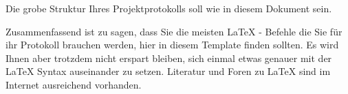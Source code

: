 \documentclass[a4paper,11pt]{scrartcl}
\begin{document}
Die grobe Struktur Ihres Projektprotokolls soll wie in diesem Dokument sein.

Zusammenfassend ist zu sagen, dass Sie die meisten \LaTeX{} - Befehle die Sie für ihr Protokoll
brauchen werden, hier in diesem Template finden sollten. Es wird Ihnen aber trotzdem nicht erspart
bleiben, sich einmal etwas genauer mit der \LaTeX{} Syntax auseinander zu setzen. Literatur und Foren
zu \LaTeX{}  sind im Internet ausreichend vorhanden.

\newpage



\end{document}
